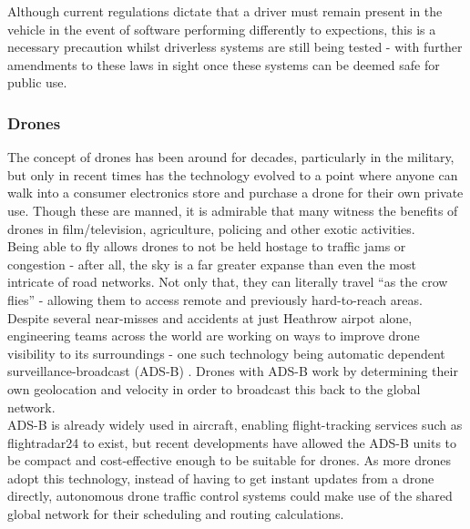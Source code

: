 \documentclass[a4paper,12pt,titlepage]{article}
\begin{document}
Although current regulations dictate that a driver must remain present in the vehicle in the event of software performing differently to expections, this is a necessary precaution whilst driverless systems are still being tested - with further amendments to these laws in sight once these systems can be deemed safe for public use\cite{Bowcott2017}.

\subsubsection{Drones}
The concept of drones has been around for decades, particularly in the military, but only in recent times has the technology evolved to a point where anyone can walk into a consumer electronics store and purchase a drone for their own private use. Though these are manned, it is admirable that many witness the benefits of drones in film/television\cite{Verrier2015}, agriculture\cite{Jarman2016}, policing\cite{BBCNews2017a} and other exotic activities\cite{Roberts2016}. \\

Being able to fly allows drones to not be held hostage to traffic jams or congestion - after all, the sky is a far greater expanse than even the most intricate of road networks. Not only that, they can literally travel ``as the crow flies'' - allowing them to access remote and previously hard-to-reach areas.\\

Despite several near-misses \cite{Davies2017} and accidents\cite{BBCNews2016} at just Heathrow airpot alone, engineering teams across the world are working on ways to improve drone visibility to its surroundings - one such technology being automatic dependent surveillance-broadcast (ADS-B) \cite{Dillow2015}. Drones with ADS-B work by determining their own geolocation and velocity in order to broadcast this back to the global network.\\

ADS-B is already widely used in aircraft, enabling flight-tracking services such as flightradar24 to exist\cite{Flightradar242018}, but recent developments have allowed the ADS-B units to be compact and cost-effective enough to be suitable for drones. As more drones adopt this technology, instead of having to get instant updates from a drone directly, autonomous drone traffic control systems could make use of the shared global network for their scheduling and routing calculations. \\
\end{document}

